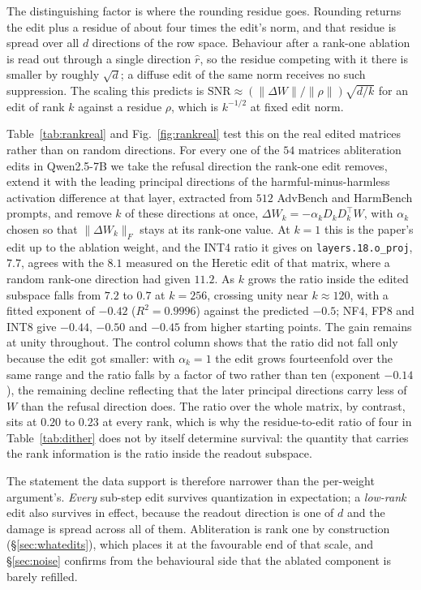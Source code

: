 \documentclass[conference,compsoc,letterpaper]{IEEEtran}
\begin{document}
The distinguishing factor is where the rounding residue goes. Rounding returns the edit plus a residue of about four times the edit's norm, and that residue is spread over all $d$ directions of the row space. Behaviour after a rank-one ablation is read out through a single direction $\hat{r}$, so the residue competing with it there is smaller by roughly $\sqrt{d}$; a diffuse edit of the same norm receives no such suppression. The scaling this predicts is $\mathrm{SNR} \approx (\|\Delta W\|/\|\rho\|)\sqrt{d/k}$ for an edit of rank $k$ against a residue $\rho$, which is $k^{-1/2}$ at fixed edit norm.

Table~\ref{tab:rankreal} and Fig.~\ref{fig:rankreal} test this on the real edited matrices rather than on random directions. For every one of the $54$ matrices abliteration edits in Qwen2.5-7B we take the refusal direction the rank-one edit removes, extend it with the leading principal directions of the harmful-minus-harmless activation difference at that layer, extracted from $512$ AdvBench and HarmBench prompts, and remove $k$ of these directions at once, $\Delta W_k = -\alpha_k D_k D_k^{\top} W$, with $\alpha_k$ chosen so that $\|\Delta W_k\|_F$ stays at its rank-one value. At $k = 1$ this is the paper's edit up to the ablation weight, and the INT4 ratio it gives on \texttt{layers.18.o\_proj}, $7.7$, agrees with the $8.1$ measured on the Heretic edit of that matrix, where a random rank-one direction had given $11.2$. As $k$ grows the ratio inside the edited subspace falls from $7.2$ to $0.7$ at $k = 256$, crossing unity near $k \approx 120$, with a fitted exponent of $-0.42$ ($R^2 = 0.9996$) against the predicted $-0.5$; NF4, FP8 and INT8 give $-0.44$, $-0.50$ and $-0.45$ from higher starting points. The gain remains at unity throughout. The control column shows that the ratio did not fall only because the edit got smaller: with $\alpha_k = 1$ the edit grows fourteenfold over the same range and the ratio falls by a factor of two rather than ten (exponent $-0.14$), the remaining decline reflecting that the later principal directions carry less of $W$ than the refusal direction does. The ratio over the whole matrix, by contrast, sits at $0.20$ to $0.23$ at every rank, which is why the residue-to-edit ratio of four in Table~\ref{tab:dither} does not by itself determine survival: the quantity that carries the rank information is the ratio inside the readout subspace.

The statement the data support is therefore narrower than the per-weight argument's. \emph{Every} sub-step edit survives quantization in expectation; a \emph{low-rank} edit also survives in effect, because the readout direction is one of $d$ and the damage is spread across all of them. Abliteration is rank one by construction (\S\ref{sec:whatedits}), which places it at the favourable end of that scale, and \S\ref{sec:noise} confirms from the behavioural side that the ablated component is barely refilled.
\end{document}
